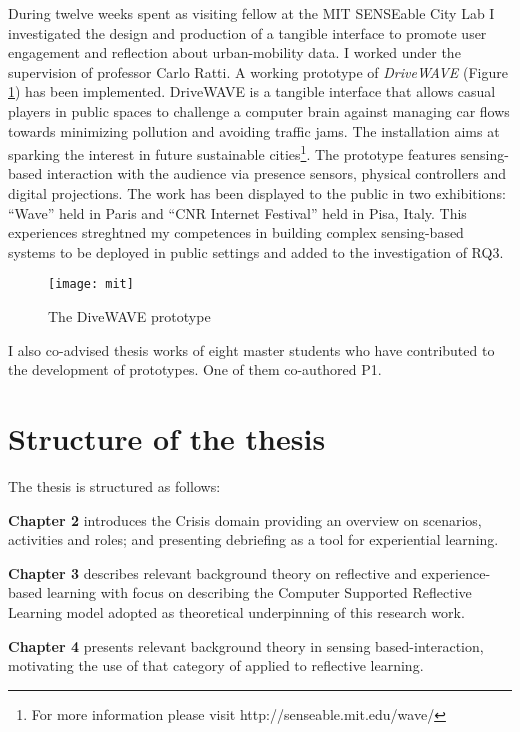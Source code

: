 During twelve weeks spent as visiting fellow at the MIT SENSEable City
Lab I investigated the design and production of a tangible interface to
promote user engagement and reflection about urban-mobility data. I
worked under the supervision of professor Carlo Ratti. A working
prototype of \emph{DriveWAVE} (Figure \ref{fig:drivewave}) has been
implemented. DriveWAVE is a tangible interface that allows casual
players in public spaces to challenge a computer brain against managing
car flows towards minimizing pollution and avoiding traffic jams. The
installation aims at sparking the interest in future sustainable
cities\footnote{For more information please visit
  http://senseable.mit.edu/wave/}. The prototype features sensing-based
interaction with the audience via presence sensors, physical controllers
and digital projections. The work has been displayed to the public in
two exhibitions: ``Wave'' held in Paris and ``CNR Internet Festival''
held in Pisa, Italy. This experiences streghtned my competences in
building complex sensing-based systems to be deployed in public settings
and added to the investigation of RQ3.

\begin{figure}[h]
    \centering
    \texttt{[image: mit]}
    \caption{The DiveWAVE prototype}
    \label{fig:drivewave}
\end{figure}

I also co-advised thesis works of eight master students who have
contributed to the development of prototypes. One of them co-authored
P1.

\section{Structure of the thesis}\label{structure-of-the-thesis}

The thesis is structured as follows:

\textbf{Chapter 2} introduces the Crisis domain providing an overview on
scenarios, activities and roles; and presenting debriefing as a tool for
experiential learning.

\textbf{Chapter 3} describes relevant background theory on reflective
and experience-based learning with focus on describing the Computer
Supported Reflective Learning model adopted as theoretical underpinning
of this research work.

\textbf{Chapter 4} presents relevant background theory in sensing
based-interaction, motivating the use of that category of applied to
reflective learning.

